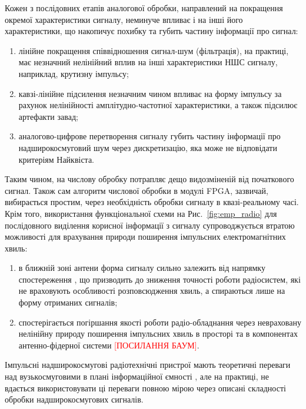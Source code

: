 Кожен з послідовних етапів аналогової обробки, направлений на покращення 
окремої характеристики сигналу, неминуче впливає і на інші його характеристики,
що накопичує похибку та губить частину інформації про сигнал:

\begin{enumerate}
	\item лінійне покращення співвідношення сигнал-шум (фільтрація), 
	на практиці, має незначний нелінійний вплив на інші характеристики НШС 
	сигналу, наприклад, крутизну імпульсу;
	\item кавзі-лінійне підсилення незначним чином впливає на 
	форму імпульсу за рахунок нелінійності амплітудно-частотної 
	характеристики, а також підсилює артефакти завад;
	\item аналогово-цифрове перетворення сигналу губить частину інформації 
	про надширокосмуговий шум через дискретизацію, яка може не відповідати критеріям Найквіста.
\end{enumerate}

Таким чином, на числову обробку потрапляє дещо видозміненій від початкового
сигнал. Також сам алгоритм числової обробки в модулі FPGA, зазвичай,
вибирається простим, через необхідність обробки сигналу в квазі-реальному 
часі. Крім того, використання функціональної схеми на Рис.~\ref{fig:emp_radio} 
для послідовного виділення корисної інформації з сигналу супроводжується
втратою можливості для врахування природи поширення імпульсних 
електромагнітних хвиль:

\begin{enumerate}
	\item в ближній зоні антени форма сигналу сильно залежить від 
	напрямку спостереження \cite{imp:Wu1985, imp:Sodin1992-10, 
	my:Telecom2018}, що призводить до зниження точності роботи радіосистем, 
	які не враховують особливості розповсюдження хвиль, а спираються лише на 
	форму отриманих сигналів;
	\item спостерігається погіршання якості роботи радіо-обладнання через 
	невраховану нелінійну природу поширення імпульсних хвиль в просторі та в 
	компонентах антенно-фідерної системи \textcolor{red}{[ПОСИЛАННЯ БАУМ]}.
\end{enumerate}

Імпульсні надширокосмугові радіотехнічні пристрої мають теоретичні 
переваги над вузькосмуговими в плані інформаційної ємності 
\cite{imp:ChannelLimitations}, але на практиці, не вдається використовувати 
ці переваги повною мірою через описані складності обробки надширокосмугових 
сигналів.

